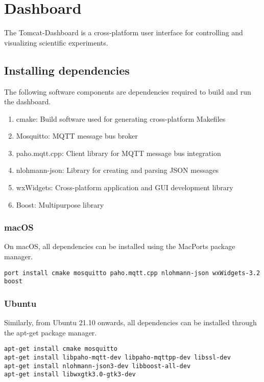 \section{Dashboard}

The Tomcat-Dashboard is a cross-platform user interface for controlling and visualizing scientific experiments.

\subsection{Installing dependencies}

The following software components are  dependencies required to build and run the dashboard.

\begin{enumerate}
    \item cmake: Build software used for generating cross-platform Makefiles
    \item Mosquitto: MQTT message bus broker
    \item paho.mqtt.cpp: Client library for MQTT message bus integration
    \item nlohmann-json:  Library for creating and parsing JSON messages
    \item wxWidgets: Cross-platform application and GUI development library
    \item Boost: Multipurpose library
\end{enumerate}

\subsubsection{macOS}

On macOS, all dependencies can be installed using the MacPorts package manager.

\begin{lstlisting}
port install cmake mosquitto paho.mqtt.cpp nlohmann-json wxWidgets-3.2 boost
\end{lstlisting}

\subsubsection{Ubuntu}

Similarly, from Ubuntu 21.10 onwards, all dependencies can be installed through
the apt-get package manager.

\begin{lstlisting}
apt-get install cmake mosquitto
apt-get install libpaho-mqtt-dev libpaho-mqttpp-dev libssl-dev
apt-get install nlohmann-json3-dev libboost-all-dev
apt-get install libwxgtk3.0-gtk3-dev
\end{lstlisting}

